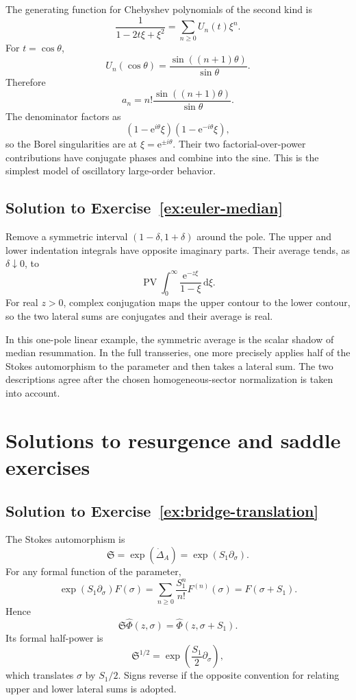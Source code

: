 \documentclass[11pt,oneside]{book}
\theoremstyle{definition}
\theoremstyle{remark}
\newcommand{\e}{\mathrm{e}}
\newcommand{\dd}{\,\mathrm{d}}
\begin{document}
The generating function for Chebyshev polynomials of the second kind is
\[
  \frac1{1-2t\xi+\xi^2}
  =\sum_{n\ge0}U_n(t)\xi^n.
\]
For $t=\cos\theta$,
\[
  U_n(\cos\theta)
  =\frac{\sin((n+1)\theta)}{\sin\theta}.
\]
Therefore
\[
  a_n=n!\frac{\sin((n+1)\theta)}{\sin\theta}.
\]
The denominator factors as
\[
  (1-\e^{i\theta}\xi)(1-\e^{-i\theta}\xi),
\]
so the Borel singularities are at $\xi=\e^{\pm i\theta}$. Their two
factorial-over-power contributions have conjugate phases and combine into the
sine. This is the simplest model of oscillatory large-order behavior.

\subsection*{Solution to Exercise~\ref{ex:euler-median}}

Remove a symmetric interval $(1-\delta,1+\delta)$ around the pole. The upper and
lower indentation integrals have opposite imaginary parts. Their average tends,
as $\delta\downarrow0$, to
\[
  \operatorname{PV}\int_0^\infty
  \frac{\e^{-z\xi}}{1-\xi}\dd\xi.
\]
For real $z>0$, complex conjugation maps the upper contour to the lower contour,
so the two lateral sums are conjugates and their average is real.

In this one-pole linear example, the symmetric average is the scalar shadow of
median resummation. In the full transseries, one more precisely applies half of
the Stokes automorphism to the parameter and then takes a lateral sum. The two
descriptions agree after the chosen homogeneous-sector normalization is taken
into account.

\section{Solutions to resurgence and saddle exercises}

\subsection*{Solution to Exercise~\ref{ex:bridge-translation}}

The Stokes automorphism is
\[
  \mathfrak S
  =\exp(\dot\Delta_A)
  =\exp(S_1\partial_\sigma).
\]
For any formal function of the parameter,
\[
  \exp(S_1\partial_\sigma)F(\sigma)
  =\sum_{n\ge0}\frac{S_1^n}{n!}F^{(n)}(\sigma)
  =F(\sigma+S_1).
\]
Hence
\[
  \mathfrak S\widehat\Phi(z,\sigma)
  =\widehat\Phi(z,\sigma+S_1).
\]
Its formal half-power is
\[
  \mathfrak S^{1/2}
  =\exp\left(\frac{S_1}{2}\partial_\sigma\right),
\]
which translates $\sigma$ by $S_1/2$. Signs reverse if the opposite convention
for relating upper and lower lateral sums is adopted.
\end{document}
